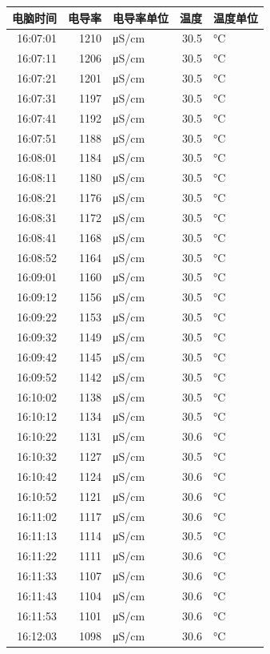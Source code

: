 \documentclass[11pt]{article}
\begin{document}
\begin{enumerate}
\begin{center}
\begin{tabular}{rrlrl}
电脑时间 & 电导率 & 电导率单位 & 温度 & 温度单位\\
\hline
16:07:01 & 1210 & μS/cm & 30.5 & °C\\
16:07:11 & 1206 & μS/cm & 30.5 & °C\\
16:07:21 & 1201 & μS/cm & 30.5 & °C\\
16:07:31 & 1197 & μS/cm & 30.5 & °C\\
16:07:41 & 1192 & μS/cm & 30.5 & °C\\
16:07:51 & 1188 & μS/cm & 30.5 & °C\\
16:08:01 & 1184 & μS/cm & 30.5 & °C\\
16:08:11 & 1180 & μS/cm & 30.5 & °C\\
16:08:21 & 1176 & μS/cm & 30.5 & °C\\
16:08:31 & 1172 & μS/cm & 30.5 & °C\\
16:08:41 & 1168 & μS/cm & 30.5 & °C\\
16:08:52 & 1164 & μS/cm & 30.5 & °C\\
16:09:01 & 1160 & μS/cm & 30.5 & °C\\
16:09:12 & 1156 & μS/cm & 30.5 & °C\\
16:09:22 & 1153 & μS/cm & 30.5 & °C\\
16:09:32 & 1149 & μS/cm & 30.5 & °C\\
16:09:42 & 1145 & μS/cm & 30.5 & °C\\
16:09:52 & 1142 & μS/cm & 30.5 & °C\\
16:10:02 & 1138 & μS/cm & 30.5 & °C\\
16:10:12 & 1134 & μS/cm & 30.5 & °C\\
16:10:22 & 1131 & μS/cm & 30.6 & °C\\
16:10:32 & 1127 & μS/cm & 30.5 & °C\\
16:10:42 & 1124 & μS/cm & 30.6 & °C\\
16:10:52 & 1121 & μS/cm & 30.6 & °C\\
16:11:02 & 1117 & μS/cm & 30.6 & °C\\
16:11:13 & 1114 & μS/cm & 30.5 & °C\\
16:11:22 & 1111 & μS/cm & 30.6 & °C\\
16:11:33 & 1107 & μS/cm & 30.6 & °C\\
16:11:43 & 1104 & μS/cm & 30.6 & °C\\
16:11:53 & 1101 & μS/cm & 30.6 & °C\\
16:12:03 & 1098 & μS/cm & 30.6 & °C\\

\end{tabular}
\end{center}
\end{enumerate}
\end{document}
